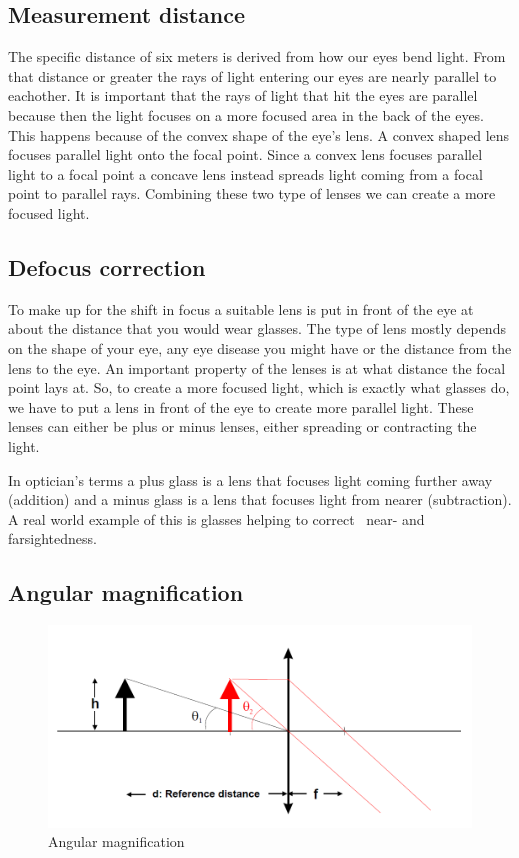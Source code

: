 \documentclass[12pt,a4paper,notitlepage]{report}
\begin{document}
\subsection{Measurement distance}
The specific distance of six meters is derived from how our eyes bend light. From that distance or greater the rays of light entering our eyes are nearly parallel to eachother. It is important that the rays of light that hit the eyes are parallel because then the light focuses on a more focused area in the back of the eyes. This happens because of the convex shape of the eye's lens. A convex shaped lens focuses parallel light onto the focal point. Since a convex lens focuses parallel light to a focal point a concave lens instead spreads light coming from a focal point to parallel rays. Combining these two type of lenses we can create a more focused light. 

\subsection{Defocus correction}
To make up for the shift in focus a suitable lens is put in front of the eye at about the distance that you would wear glasses. The type of lens mostly depends on the shape of your eye, any eye disease you might have or the distance from the lens to the eye. An important property of the lenses is at what distance the focal point lays at. So, to create a more focused light, which is exactly what glasses do, we have to put a lens in front of the eye to create more parallel light. These lenses can either be plus or minus lenses, either spreading or contracting the light.

In optician's terms a plus glass is a lens that focuses light coming further away (addition) and a minus glass is a lens that focuses light from nearer (subtraction). A real world example of this is glasses helping to correct ~near- and farsightedness.

\subsection{Angular magnification}
\begin{figure}[h]
\centering
\includegraphics[width=120mm]{images/Angular_magnification.png}
\caption{Angular magnification\label{angular}}
\end{figure}
\end{document}
